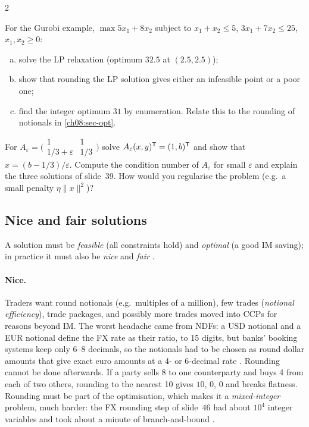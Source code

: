 \begin{paracol}{2}
\begin{exercise}
For the Gurobi example, $\max 5x_1+8x_2$ subject to $x_1+x_2\le5$, $3x_1+7x_2\le25$, $x_1,x_2\ge0$:
\begin{enumerate}[(a)]
  \item solve the LP
      relaxation (optimum $32.5$ at $(2.5,2.5)$);
  \item show that rounding the LP solution gives either an infeasible point or a
      poor one;
  \item find the integer optimum $31$ by enumeration. Relate this to the rounding of notionals in
      \cref{ch08:sec-opt}.
\end{enumerate}
\end{exercise}

\begin{exercise}
For $A_\varepsilon=\bigl(\begin{smallmatrix}1&1\\ 1/3+\varepsilon&1/3\end{smallmatrix}\bigr)$ solve $A_\varepsilon(x,y)^{\mathsf T}=(1,b)^{\mathsf T}$
and show that $x=(b-1/3)/\varepsilon$. Compute the condition number of $A_\varepsilon$ for small $\varepsilon$ and explain the
three solutions of slide~39. How would you regularise the problem (e.g.\ a small penalty $\eta\|x\|^2$)?
\end{exercise}

\subsection{Nice and fair solutions}
A solution must be \emph{feasible} (all constraints hold) and \emph{optimal} (a good IM saving); in practice it
must also be \emph{nice} and \emph{fair} .

\paragraph{Nice.} Traders want round notionals (e.g.\ multiples of a million), few trades (\emph{notional
efficiency}), trade packages, and possibly more trades moved into CCPs for reasons beyond IM. The worst headache
came from NDFs: a USD notional and a EUR notional define the FX rate as their ratio, to 15 digits, but banks' booking
systems keep only 6--8 decimals, so the notionals had to be chosen as round dollar amounts that give exact euro
amounts at a 4- or 6-decimal rate . Rounding cannot be done afterwards. If a party sells 8 to one
counterparty and buys 4 from each of two others, rounding to the nearest 10 gives $10$, $0$, $0$ and breaks
flatness. Rounding must be part of the optimisation, which makes it a \emph{mixed-integer} problem, much harder:
the FX rounding step of slide~46 had about $10^4$ integer variables and took about a minute of branch-and-bound
.


\end{paracol}
